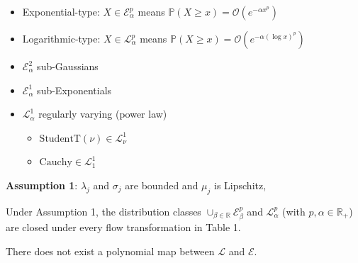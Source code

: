 \documentclass{beamer}
\newcommand{\PP}{\mathbb{P}}
\newcommand{\RR}{\mathbb{R}}
\newcommand{\cE}{\mathcal{E}}
\newcommand{\cL}{\mathcal{L}}
\newcommand{\cO}{\mathcal{O}}
\begin{document}
\begin{frame}[allowframebreaks]
    \begin{definition}
        \begin{itemize}
            \item Exponential-type: $X \in \cE_\alpha^p$ means $\PP(X \geq x) = \cO(e^{-\alpha x^p})$
            \item Logarithmic-type: $X \in \cL^p_\alpha$ means $\PP(X \geq x) = \cO(e^{-\alpha (\log x)^p})$
        \end{itemize}
    \end{definition}

    \begin{example}
        \begin{itemize}
            \item $\cE_\alpha^2$ sub-Gaussians
            \item $\cE_\alpha^1$ sub-Exponentials
            \item $\cL^1_\alpha$ regularly varying (power law)
                  \begin{itemize}
                      \item $\text{StudentT}(\nu) \in \cL^1_\nu$
                      \item $\text{Cauchy} \in \cL^1_1$
                  \end{itemize}
        \end{itemize}
    \end{example}

    \framebreak

    \textbf{Assumption 1}: $\lambda_j$ and $\sigma_j$ are bounded and $\mu_j$ is Lipschitz,

    \begin{theorem}[LHM, 2021]
        Under Assumption 1,
        the distribution classes $\cup_{\beta \in \RR} \cE_{\beta}^p$
        and $\cL^p_\alpha$ (with $p,\alpha \in \RR_+$) are closed
        under every flow transformation in Table 1.
    \end{theorem}

    \begin{theorem}[LHM, 2021]
        There does not exist a polynomial map between $\cL$ and $\cE$.
    \end{theorem}
\end{frame}
\end{document}
